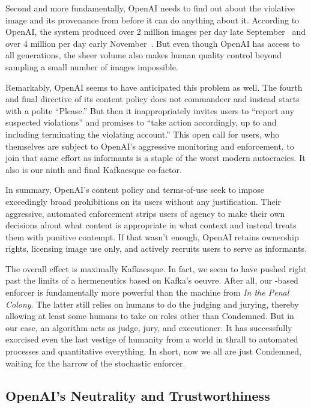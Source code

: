 Second and more fundamentally, OpenAI needs to find out about the violative
image and its provenance from \DALLE before it can do anything about it.
According to OpenAI, the system produced over 2 million images per day late
September~\cite{OpenAI2022a} and over 4 million per day early
November~\cite{OpenAI2022h}. But even though OpenAI has access to all
generations, the sheer volume also makes human quality control beyond sampling a
small number of images impossible.

Remarkably, OpenAI seems to have anticipated this problem as well. The fourth
and final directive of its content policy does not commandeer and instead starts
with a polite “Please.” But then it inappropriately invites users to “report any
suspected violations” and promises to “take action accordingly, up to and
including terminating the violating account.” This open call for users, who
themselves are subject to OpenAI's aggressive monitoring and enforcement, to
join that same effort as informants is a staple of the worst modern autocracies.
It also is our ninth and final Kafkaesque co-factor.

In summary, OpenAI's content policy and terms-of-use seek to impose exceedingly
broad prohibitions on its users without any justification. Their aggressive,
automated enforcement strips users of agency to make their own decisions about
what content is appropriate in what context and instead treats them with
punitive contempt. If that wasn't enough, OpenAI retains ownership rights,
licensing image use only, and actively recruits users to serve as informants.

The overall effect is maximally Kafkaesque. In fact, we seem to have pushed
right past the limits of a hermeneutics based on Kafka's oeuvre. After all, our
\AI-based enforcer is fundamentally more powerful than the machine from \emph{In
the Penal Colony}. The latter still relies on humans to do the judging and
jurying, thereby allowing at least some humans to take on roles other than
Condemned. But in our case, an algorithm acts as judge, jury, and executioner.
It has successfully exorcised even the last vestige of humanity from a world in
thrall to automated processes and quantitative everything. In short, now we all
are just Condemned, waiting for the harrow of the stochastic enforcer.


\subsection{OpenAI's Neutrality and Trustworthiness}

